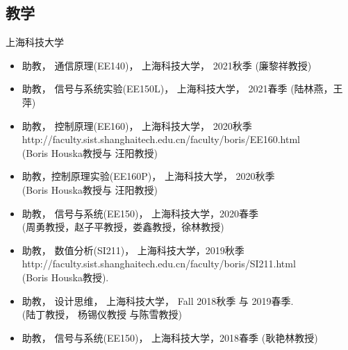 \documentclass[paper=a4,fontsize=11pt]{scrartcl} %
\newlength{\spacebox}
\newcommand{\NewPart}[1]{\section*{\uppercase{#1}}}
\newcommand{\PersonalEntry}[2]{
		\noindent\hangindent=2em\hangafter=0 %
		\parbox{\spacebox}{        %
		\textit{#1}}		       %
		\hspace{1.5em} #2 \par}    %
\newcommand{\SkillsEntry}[2]{      %
		\noindent\hangindent=2em\hangafter=0 %
		\parbox{\spacebox}{        %
		\textit{#1}}			   %
		\hspace{1.5em} #2 \par}    %
\begin{document}
\begin{CJK*}{UTF8}{gbsn}
\NewPart{教学}{上海科技大学}
\begin{itemize}
	
	
	\item{助教， 	通信原理(EE140)， 上海科技大学， 2021秋季 (廉黎祥教授)}
	
	\item{助教，  信号与系统实验(EE150L)， 上海科技大学， 2021春季 (陆林燕，王萍)}
	
	\item{助教， 控制原理(EE160)， 上海科技大学， 2020秋季\\ 
		http://faculty.sist.shanghaitech.edu.cn/faculty/boris/EE160.html\\
		(Boris Houska教授与 汪阳教授)
	}
	
	\item{助教，控制原理实验(EE160P)， 上海科技大学， 2020秋季\\ (Boris Houska教授与 汪阳教授)}
	
	\item{助教， 信号与系统(EE150)，  上海科技大学，2020春季 \\ (周勇教授，赵子平教授，娄鑫教授，徐林教授)}
	
	\item{助教， 数值分析(SI211)， 上海科技大学，2019秋季\\ 
		{http://faculty.sist.shanghaitech.edu.cn/faculty/boris/SI211.html}\\
		(Boris Houska教授).
	}
	
	\item{助教， 设计思维， 上海科技大学， Fall 2018秋季 与 2019春季.\\ (陆丁教授， 杨锡仪教授 与陈雪教授) }
	
	\item{助教， 信号与系统(EE150)，  上海科技大学，2018春季 (耿艳林教授)
		}


	
\end{itemize}



\end{CJK*}
\end{document}
